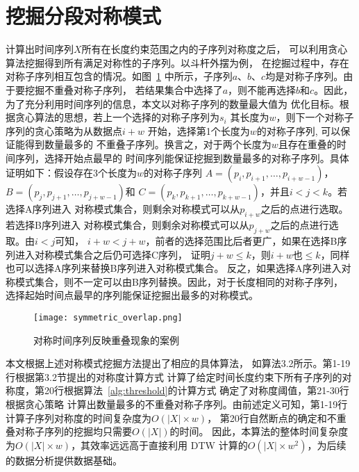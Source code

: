 \section{挖掘分段对称模式}

计算出时间序列$X$所有在长度约束范围之内的子序列对称度之后，
可以利用贪心算法挖掘得到所有满足对称性的子序列。以斗杆外摆为例，
在挖掘过程中，存在对称子序列相互包含的情况。如图~\ref{fig:overlap}
中所示，子序列$a$、$b$、$c$均是对称子序列。由于要挖掘不重叠对称子序列，
若结果集合中选择了$a$，则不能再选择$b$和$c$。因此，
为了充分利用时间序列的信息，本文以对称子序列的数量最大值为
优化目标。根据贪心算法的思想，若上一个选择的对称子序列为$s_i$
其长度为$w$，则下一个对称子序列的贪心策略为从数据点$i+w$
开始，选择第1个长度为$w$的对称子序列, 可以保证能得到数量最多的
不重叠子序列。换言之，对于两个长度为$w$且存在重叠的时间序列，选择开始点最早的
时间序列能保证挖掘到数量最多的对称子序列。具体证明如下：假设存在3个长度为$w$的对称子序列
$A=\left(p_{i}, p_{i+1}, \dots, p_{i+w-1}\right)$，$B=\left(p_{j}, p_{j+1}, \dots, p_{j+w-1}\right)$和
$C=\left(p_{k}, p_{k+1}, \dots, p_{k+w-1}\right)$，并且$i<j<k$。若选择A序列进入
对称模式集合，则剩余对称模式可以从$p_{i+w}$之后的点进行选取。若选择B序列进入
对称模式集合，则剩余对称模式可以从$p_{j+w}$之后的点进行选取。由$i<j$可知，
$i+w<j+w$，前者的选择范围比后者更广，如果在选择B序列进入对称模式集合之后仍可选择C序列，
证明$j+w \leq k$，则$i+w$也$\leq k$，同样也可以选择A序列来替换B序列进入对称模式集合。
反之，如果选择A序列进入对称模式集合，则不一定可以由B序列替换。因此，对于长度相同的对称子序列，
选择起始时间点最早的序列能保证挖掘出最多的对称模式。

\begin{figure}
  \centering
  \texttt{[image: symmetric\_overlap.png]}
  \caption{对称时间序列反映重叠现象的案例}
  \label{fig:overlap}
\end{figure}

本文根据上述对称模式挖掘方法提出了相应的具体算法，
如算法3.2所示。第1-19行根据第3.2节提出的对称度计算方式
计算了给定时间长度约束下所有子序列的对称度，第20行根据算法~\ref{alg:threshold}的计算方式
确定了对称度阈值，第21-30行根据贪心策略
计算出数量最多的不重叠对称子序列。由前述定义可知，第1-19行计算子序列对称度的时间复杂度为$O(|X| \times w)$，
第20行自然断点的确定和不重叠对称子序列的挖掘均只需要$O(|X|)$的时间。
因此，本算法的整体时间复杂度为$O(|X| \times w)$，其效率远远高于直接利用
DTW 计算的$O\left(|X| \times w^{2}\right)$，为后续的数据分析提供数据基础。
\renewcommand{\algorithmicrequire}{\textbf{输入：}\unskip}
\renewcommand{\algorithmicensure}{\textbf{输出：}\unskip}


